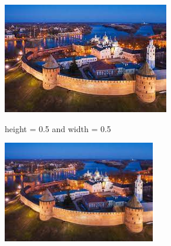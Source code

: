 \documentclass{article}
\begin{document}
\begin{center}
\includegraphics[height = 0.5\textheight]{example-image}
\end{center}
height = 0.5 and width = 0.5
\begin{center}
\includegraphics[width = 0.5\textwidth]{example-image}
\end{center}
\end{document}
